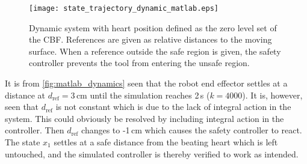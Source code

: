 \vspace{-2mm}
\begin{figure}[H]
	\center
		\texttt{[image: state\_trajectory\_dynamic\_matlab.eps]}
	\caption{Dynamic system with heart position defined as the zero level set of the CBF. References are given as relative distances to the moving surface. When a reference outside the safe region is given, the safety controller prevents the tool from entering the unsafe region.}
    \label{fig:matlab_dynamics}
\end{figure}
It is from \autoref{fig:matlab_dynamics} seen that the robot end effector settles at a distance at $d_\text{ref}=3\,$cm until the simulation reaches 2\,s ($k=4000$). It is, however, seen that $d_\text{ref}$ is not constant which is due to the lack of integral action in the system. This could obviously be resolved by including integral action in the controller.  Then $d_\text{ref}$ changes to -1\,cm which causes the safety controller to react. The state $x_1$ settles at a safe distance from the beating heart which is left untouched, and the simulated controller is thereby verified to work as intended.
\vspace{-0.2cm}

